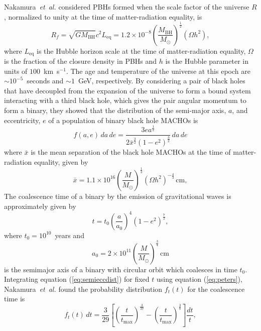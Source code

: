 Nakamura~\emph{et~al.} considered PBHs formed when the scale factor of the
universe $R$, normalized to unity at the time of matter-radiation equality,
is\cite{Nakamura:1997sm}
\begin{equation}
R_f = \sqrt{GM_\mathrm{BH}}{c^2L_\mathrm{eq}} =
1.2\times 10^{-8} \left(\frac{M_\mathrm{BH}}{M_\odot}\right)^\frac{1}{2}
(\Omega h^2),
\end{equation}
where $L_\mathrm{eq}$ is the Hubble horizon scale at the time of
matter-radiation equality, $\Omega$ is the fraction of the closure density in
PBHs and $h$ is the Hubble parameter in units of $100$~km~s$^{-1}$. The age
and temperature of the universe at this epoch are $\sim 10^{-5}$~seconds and
$\sim 1$~GeV, respectively. By considering a pair of black holes that have
decoupled from the expansion of the universe to form a bound system
interacting with a third black hole, which gives the pair angular momentum to
form a binary, they showed that the distribution of the semi-major axis, $a$,
and eccentricity, $e$ of a population of binary black hole MACHOs is
\begin{equation}
f(a,e)\, da\, de = 
\frac{ 3ea^{\frac{1}{2}} }
{ 2\bar{x}^{\frac{3}{2}} (1-e^2)^{\frac{3}{2}}  } \, da\, de 
\label{eq:semieccdist}
\end{equation}
where $\bar{x}$ is the mean separation of the black hole MACHOs at the time of
matter-radiation equality, given by
\begin{equation}
\bar{x} = 1.1 \times 10^{16} \left(\frac{M}{M_\odot}\right)^{\frac{1}{3}}
\left(\Omega h^2\right)^{-\frac{4}{3}} \,\mathrm{cm},
\end{equation}
The coalescence time of a binary by the emission of gravitational waves is
approximately given by
\cite{Peters:1964}
\begin{equation}
t = t_0 \left(\frac{a}{a_0}\right)^4 \left(1 - e^2\right)^{\frac{7}{2}},
\label{eq:peters}
\end{equation}
where $t_0 = 10^{10}$~years and
\begin{equation}
a_0 = 2 \times 10^{11}
\left(\frac{M}{M_\odot}\right)^{\frac{3}{4}}\,\mathrm{cm}
\end{equation}
is the semimajor axis of a binary with circular orbit which coalesces in time
$t_0$. Integrating equation (\ref{eq:semieccdist}) for fixed $t$ using equation
(\ref{eq:peters}), Nakamura~\emph{et~al.} found the probability distribution $f_t(t)$
for the coalescence time is
\begin{equation}
f_t(t)\,dt = \frac{3}{29}\left[
\left(\frac{t}{t_\mathrm{max}}\right)^{\frac{3}{37}} -
\left(\frac{t}{t_\mathrm{max}}\right)^{\frac{3}{8}}\right] \frac{dt}{t},
\end{equation}
